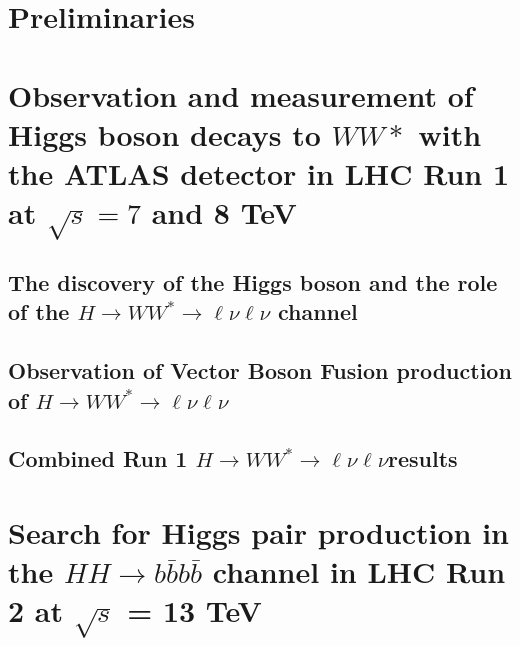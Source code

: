 \documentclass{Dissertate}
\begin{document}


\maketitle
\copyrightpage

\abstractpage
\tableofcontents
\listoffigures
\dedicationpage
\acknowledgments

\doublespacing

\newcommand\HWWfull          {$H\rightarrow WW^{*}\rightarrow \ell\nu\ell\nu$ }


\setcounter{chapter}{-1}  %

\part{Preliminaries}


\part{Observation and measurement of Higgs boson decays to $WW*$ with
  the ATLAS detector in LHC Run 1 at $\sqrt{s} = 7$ and 8 TeV}



\chapter{The discovery of the Higgs boson and the role of the $H\rightarrow WW^{*}\rightarrow \ell\nu\ell\nu$ channel}

\chapter{Observation of Vector Boson Fusion production of $H\rightarrow WW^{*}\rightarrow \ell\nu\ell\nu$}

\chapter{Combined Run 1 $H\rightarrow WW^{*}\rightarrow \ell\nu\ell\nu$results}

\part{Search for Higgs pair production in the $HH\rightarrow
  b\bar{b}b\bar{b}$ channel in LHC Run 2 at $\sqrt{s}$ = 13 TeV}
\end{document}
